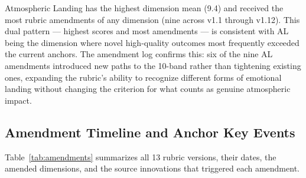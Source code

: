 Atmospheric Landing has the highest dimension mean (9.4) and received the most rubric
amendments of any dimension (nine across v1.1 through v1.12). This dual pattern ---
highest scores and most amendments --- is consistent with AL being the dimension where
novel high-quality outcomes most frequently exceeded the current anchors. The amendment
log confirms this: six of the nine AL amendments introduced new paths to the 10-band
rather than tightening existing ones, expanding the rubric's ability to recognize
different forms of emotional landing without changing the criterion for what counts as
genuine atmospheric impact.

\subsection{Amendment Timeline and Anchor Key Events}

Table~\ref{tab:amendments} summarizes all 13 rubric versions, their dates, the amended
dimensions, and the source innovations that triggered each amendment.

